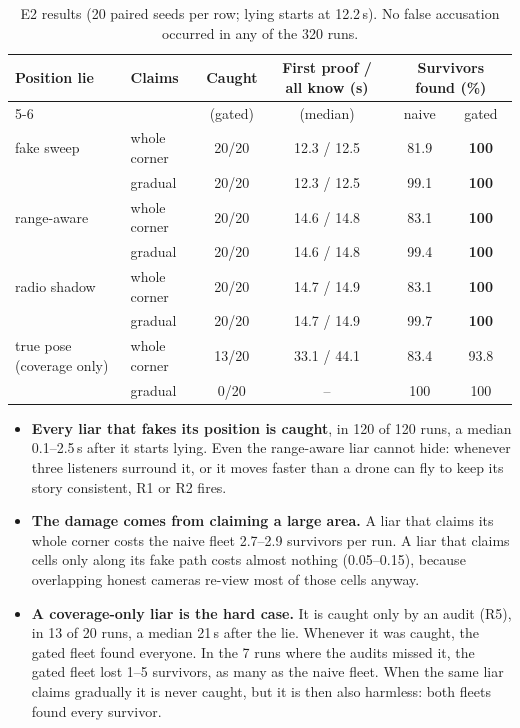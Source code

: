 \begin{table}[!htbp]
\centering
\renewcommand{\arraystretch}{1.18}
\begin{tabular}{@{}l l c c c c@{}}
\toprule
\textbf{Position lie} & \textbf{Claims} & \textbf{Caught} & \textbf{First proof / all know (s)} &
\multicolumn{2}{c}{\textbf{Survivors found (\%)}} \\
\cmidrule(lr){5-6}
 & & (gated) & (median) & naive & gated \\
\midrule
fake sweep   & whole corner & 20/20 & 12.3 / 12.5 & 81.9 & \textbf{100} \\
             & gradual      & 20/20 & 12.3 / 12.5 & 99.1 & \textbf{100} \\
range-aware  & whole corner & 20/20 & 14.6 / 14.8 & 83.1 & \textbf{100} \\
             & gradual      & 20/20 & 14.6 / 14.8 & 99.4 & \textbf{100} \\
radio shadow & whole corner & 20/20 & 14.7 / 14.9 & 83.1 & \textbf{100} \\
             & gradual      & 20/20 & 14.7 / 14.9 & 99.7 & \textbf{100} \\
true pose (coverage only) & whole corner & 13/20 & 33.1 / 44.1 & 83.4 & 93.8 \\
             & gradual      & 0/20  & -- & 100 & 100 \\
\bottomrule
\end{tabular}
\caption[E2: detection results]{E2 results (20 paired seeds per row; lying starts at 12.2\,s). No false
accusation occurred in any of the 320 runs.}
\label{tab:e2}
\end{table}

\begin{findingbox}
\begin{itemize}
    \item \textbf{Every liar that fakes its position is caught}, in 120 of 120 runs, a median 0.1--2.5\,s after it
          starts lying. Even the range-aware liar cannot hide: whenever three listeners surround it, or it moves faster
          than a drone can fly to keep its story consistent, R1 or R2 fires.
    \item \textbf{The damage comes from claiming a large area.} A liar that claims its whole corner costs the naive
          fleet 2.7--2.9 survivors per run. A liar that claims cells only along its fake path costs almost nothing
          (0.05--0.15), because overlapping honest cameras re-view most of those cells anyway.
    \item \textbf{A coverage-only liar is the hard case.} It is caught only by an audit (R5), in 13 of 20 runs, a
          median 21\,s after the lie. Whenever it was caught, the gated fleet found everyone. In the 7 runs where the
          audits missed it, the gated fleet lost 1--5 survivors, as many as the naive fleet. When the same liar claims
          gradually it is never caught, but it is then also harmless: both fleets found every survivor.
\end{itemize}
\end{findingbox}

